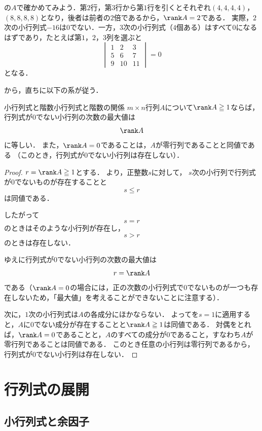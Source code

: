 の$A$で確かめてみよう．第$2$行，第$3$行から第$1$行を引くとそれぞれ$(4, 4, 4, 4)$，$(8, 8, 8, 8)$となり，後者は前者の$2$倍であるから，$\rank A = 2$である．
実際，$2$次の小行列式$-16$は$0$でない．一方，$3$次の小行列式（$4$個ある）はすべて$0$になるはずであり，たとえば第$1$，$2$，$3$列を選ぶと
\[
  \begin{vmatrix} 1 & 2 & 3 \\ 5 & 6 & 7 \\ 9 & 10 & 11 \end{vmatrix} = 0
\]
となる．

から，直ちに以下の系が従う．

\begin{cor}{小行列式と階数}{小行列式と階数の関係}
  $m\times n$行列$A$について$\rank A \geqq 1$ならば，
  行列式が$0$でない小行列の次数の最大値は
  \[
    \rank A
  \]
  に等しい．
  また，$\rank A = 0$であることは，$A$が零行列であることと同値である
  （このとき，行列式が$0$でない小行列は存在しない）．
\end{cor}

\begin{tleftbar}
\begin{proof}
$r = \rank A \geqq 1$とする．
より，正整数$s$に対して，
$s$次の小行列で行列式が$0$でないものが存在することと
\[
s\le r
\]
は同値である．

したがって
\[
s=r
\]
のときはそのような小行列が存在し，
\[
s>r
\]
のときは存在しない．

ゆえに行列式が$0$でない小行列の次数の最大値は
\[
r=\rank A
\]
である（$\rank A = 0$の場合には，正の次数の小行列式で$0$でないものが一つも存在しないため，「最大値」を考えることができないことに注意する）．

次に，$1$次の小行列式は$A$の各成分にほかならない．
よってを$s = 1$に適用すると，$A$に$0$でない成分が存在することと$\rank A \geqq 1$は同値である．
対偶をとれば，$\rank A = 0$であることと，$A$のすべての成分が$0$であること，すなわち$A$が零行列であることは同値である．
このとき任意の小行列は零行列であるから，行列式が$0$でない小行列は存在しない．
\end{proof}
\end{tleftbar}

\section{行列式の展開}

\subsection{小行列式と余因子}

